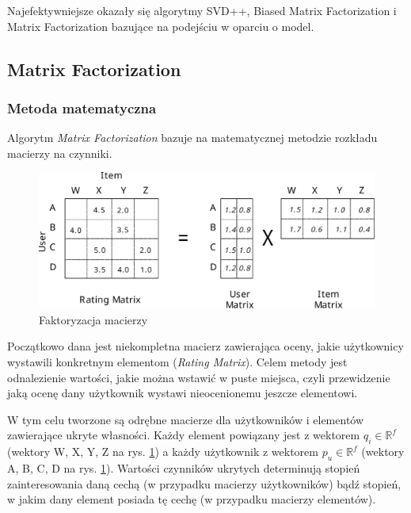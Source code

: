 \documentclass[twoside]{iisthesis}
\begin{document}
	 
		 Najefektywniejsze okazały się algorytmy SVD++, Biased Matrix Factorization i Matrix Factorization bazujące na podejściu w oparciu o model. 
	 	 
		 \subsection{Matrix Factorization}
		
		 \subsubsection{Metoda matematyczna}	
	
		 Algorytm \textit{Matrix Factorization} bazuje na matematycznej metodzie rozkładu macierzy na czynniki.
	
	
			  \begin{figure}[!ht] 
			  	\centering
			  	\includegraphics[width=1\textwidth]{factorization}
			  	\caption{Faktoryzacja macierzy \protect\cite{id:ComputingRecommendationsExtremeScaleApacheFlink}}
			  	\label{fig:factorization}
			  \end{figure}
			 
		Początkowo dana jest niekompletna macierz zawierająca oceny, jakie użytkownicy wystawili konkretnym elementom (\textit{Rating Matrix}). Celem metody jest odnalezienie wartości, jakie można wstawić w puste miejsca, czyli przewidzenie jaką ocenę dany użytkownik wystawi nieocenionemu jeszcze elementowi. 		
		
		W tym celu tworzone są odrębne macierze dla użytkowników i elementów zawierające ukryte własności. Każdy element powiązany jest z wektorem $q_i \in \mathbb{R} ^f$ (wektory W, X, Y, Z na rys. \ref{fig:factorization}) a każdy użytkownik z wektorem $p_u \in \mathbb{R} ^f$ (wektory A, B, C, D na rys. \ref{fig:factorization}). Wartości czynników ukrytych determinują stopień zainteresowania daną cechą (w przypadku macierzy użytkowników) bądź stopień, w jakim dany element posiada tę cechę (w przypadku macierzy elementów).		
		
\end{document}
